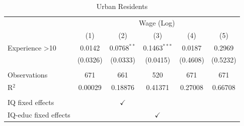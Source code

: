 
\begin{table}[htbp]
   \caption{\label{tab:wage_reg_ruban} Urban Residents}
   \bigskip
   \centering
   \begin{tabular}{lccccc}
      \toprule
       & \multicolumn{5}{c}{Wage (Log)}\\
                            & (1)      & (2)           & (3)            & (4)      & (5)\\  
      \midrule 
      Experience >10        & 0.0142   & 0.0768$^{**}$ & 0.1463$^{***}$ & 0.0187   & 0.2969\\   
                            & (0.0326) & (0.0333)      & (0.0415)       & (0.4608) & (0.5232)\\   
       \\
      Observations          & 671      & 661           & 520            & 671      & 671\\  
      R$^2$                 & 0.00029  & 0.18876       & 0.41371        & 0.27008  & 0.66708\\  
       \\
      IQ fixed effects      &          & $\checkmark$  &                &          & \\  
      IQ-educ fixed effects &          &               & $\checkmark$   &          & \\  
      \bottomrule
   \end{tabular}
\end{table}


